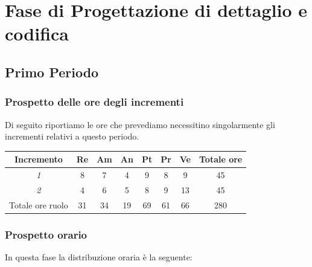 {{{{{{\section{Fase di Progettazione di dettaglio e codifica}\label{PreventivoFaseDiProgettazioneDiDettaglioECodifica}

\subsection{Primo Periodo}\label{PreventivoFaseDiProgettazioneDiDettaglioECodificaPeriodo1}

\subsubsection{Prospetto delle ore degli incrementi}\label{PreventivoFaseDiProgettazioneDiDettaglioECodificaPeriodo1Incrementi}
Di seguito riportiamo le ore che prevediamo necessitino singolarmente gli incrementi relativi a questo periodo.
\quad
\def\tabularxcolumn#1{m{#1}}
{
	
	\begin{center}
		\renewcommand{\arraystretch}{1.4}
		\begin{tabularx}{\textwidth}{|c|c|c|c|c|c|c|c|}
			\hline
			\rowcolor{airforceblue}
			\textbf{Incremento} & \textbf{Re} & \textbf{Am} & \textbf{An} & \textbf{Pt} & \textbf{Pr} & \textbf{Ve} & \textbf{Totale ore}\\
			\hline
			\textit{1} & 8 & 7 & 4 & 9 & 8 & 9 & 45\\
			\hline
			\textit{2} & 4 & 6 & 5 & 8 & 9 & 13 & 45\\
			\hline
			Totale ore ruolo & 31 & 34 & 19 & 69 & 61 & 66 & 280\\
			\hline
		\end{tabularx}
	\end{center}

\subsubsection{Prospetto orario}\label{PreventivoFaseDiProgettazioneDiDettaglioECodificaProspettoOrarioPeriodo1}
In questa fase la distribuzione oraria è la seguente:
\quad
\def\tabularxcolumn#1{m{#1}}
{

}}}}}}}}
